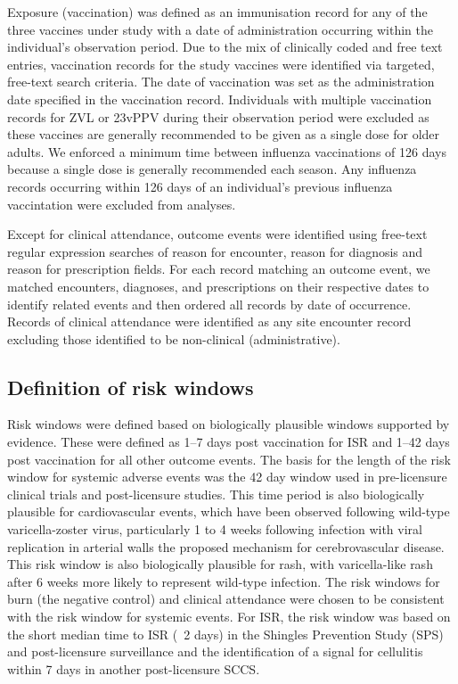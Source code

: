 \documentclass[review, endfloat]{elsarticle}
\begin{document}
Exposure (vaccination) was defined as an immunisation record for any of the three vaccines under study with a date of administration occurring within the individual’s observation period. Due to the mix of clinically coded and free text entries, vaccination records for the study vaccines were identified via targeted, free-text search criteria. The date of vaccination was set as the administration date specified in the vaccination record. Individuals with multiple vaccination records for ZVL or 23vPPV during their observation period were excluded as these vaccines are generally recommended to be given as a single dose for older adults. We enforced a minimum time between influenza vaccinations of 126 days because a single dose is generally recommended each season. Any influenza records occurring within 126 days of an individual’s previous influenza vaccintation were excluded from analyses.

Except for clinical attendance, outcome events were identified using free-text regular expression searches of reason for encounter, reason for diagnosis and reason for prescription fields. For each record matching an outcome event, we matched encounters, diagnoses, and prescriptions on their respective dates to identify related events and then ordered all records by date of occurrence. Records of clinical attendance were identified as any site encounter record excluding those identified to be non-clinical (administrative). 

\subsection{Definition of risk windows}

Risk windows were defined based on biologically plausible windows supported by evidence. These were defined as 1–7 days post vaccination for ISR and 1–42 days post vaccination for all other outcome events. The basis for the length of the risk window for systemic adverse events was the 42 day window used in pre-licensure clinical trials and post-licensure studies. This time period is also biologically plausible for cardiovascular events, which have been observed following wild-type varicella-zoster virus, particularly 1 to 4 weeks following infection with viral replication in arterial walls the proposed mechanism for cerebrovascular disease. This risk window is also biologically plausible for rash, with varicella-like rash after 6 weeks more likely to represent wild-type infection. The risk windows for burn (the negative control) and clinical attendance were chosen to be consistent with the risk window for systemic events. For ISR, the risk window was based on the short median time to ISR (~2 days) in the Shingles Prevention Study (SPS) and post-licensure surveillance and the identification of a signal for cellulitis within 7 days in another post-licensure SCCS.
\end{document}
